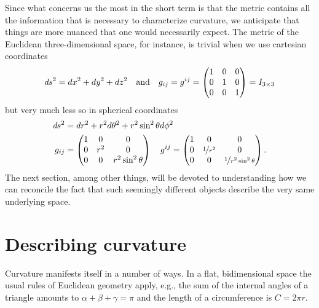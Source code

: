 Since what concerns us the most in the short term is that the metric contains all
the information that is necessary to characterize curvature, we anticipate that things
are more nuanced that one would necessarily expect. The metric of the Euclidean
three-dimensional space, for instance, is trivial when we use cartesian
coordinates
\begin{align*}
  \emph{d}s^2 = dx^2 + dy^2 + dz^2 \quad\text{and}\quad
  g_{ij} = g^{ij} =
  \begin{pmatrix}
    1 & 0 & 0\\
    0 & 1 & 0\\
    0 & 0 & 1\\
    \end{pmatrix}
    = I_{3 \times 3}
\end{align*}
but very much less so in spherical coordinates
\begin{align*}
  \dss &= dr^2 + r^2d\theta^2 + r^2\sin^2\theta d\phi^2\\ %
  g_{ij} &=
  \begin{pmatrix}
    1 & 0 & 0\\
    0 & r^2 & 0\\
    0 & 0 & r^2 \sin^2\theta\\
  \end{pmatrix} \quad
  g^{ij} =
  \begin{pmatrix}
    1 & 0 & 0\\
    0 & \nicefrac{1}{r^2} & 0\\
    0 & 0 & \nicefrac{1}{r^2 \sin^2\theta}\\
  \end{pmatrix}.
\end{align*}
The next section, among other things, will be devoted to understanding how we can
reconcile the fact that such seemingly different objects describe the very same
underlying space.



\section{Describing curvature}

Curvature manifests itself in a number of ways. In a flat, bidimensional space the
usual rules of Euclidean geometry apply, e.g., the sum of the internal angles of a
triangle amounts to $\alpha + \beta + \gamma = \pi$ and the length of a circumference
is $C = 2\pi r$.

